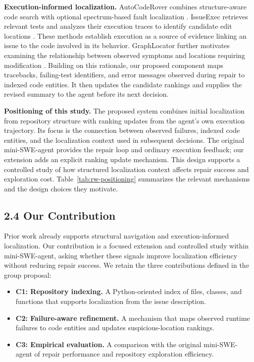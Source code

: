 \documentclass[11pt]{article}
\begin{document}
\textbf{Execution-informed localization.}
AutoCodeRover combines structure-aware code search with optional
spectrum-based fault localization \cite{zhang2024autocoderover}.
IssueExec retrieves relevant tests and analyzes their execution
traces to identify candidate edit locations \cite{liu2026issueexec}.
These methods establish execution as a source of evidence linking
an issue to the code involved in its behavior.
GraphLocator further motivates examining the relationship between
observed symptoms and locations requiring modification
\cite{liu2025graphlocator}.
Building on this rationale, our proposed component maps tracebacks,
failing-test identifiers, and error messages observed during repair
to indexed code entities.
It then updates the candidate rankings and supplies the revised
summary to the agent before its next decision.

\textbf{Positioning of this study.}
The proposed system combines initial localization from repository
structure with ranking updates from the agent's own execution
trajectory.
Its focus is the connection between observed failures, indexed
code entities, and the localization context used in subsequent
decisions.
The original mini-SWE-agent provides the repair loop and ordinary
execution feedback; our extension adds an explicit ranking update
mechanism.
This design supports a controlled study of how structured
localization context affects repair success and exploration cost.
Table~\ref{tab:rw-positioning} summarizes the relevant mechanisms
and the design choices they motivate.

\subsection*{2.4 Our Contribution}

Prior work already supports structural navigation and execution-informed localization. Our contribution is a focused extension and controlled study within mini-SWE-agent, asking whether these signals improve localization efficiency without reducing repair success. We retain the three contributions defined in the group proposal:

\begin{itemize}
    \item \textbf{C1: Repository indexing.} A Python-oriented index of files, classes, and functions that supports localization from the issue description.
    \item \textbf{C2: Failure-aware refinement.} A mechanism that maps observed runtime failures to code entities and updates suspicious-location rankings.
    \item \textbf{C3: Empirical evaluation.} A comparison with the original mini-SWE-agent of repair performance and repository exploration efficiency.
\end{itemize}
\end{document}
